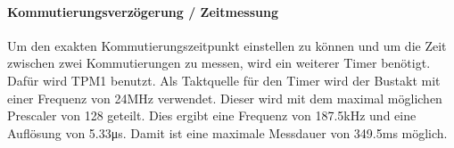 \paragraph{Kommutierungsverzögerung / Zeitmessung}$~~$\vspace{2mm}\\
\fi
Um den exakten Kommutierungszeitpunkt einstellen zu können und um die Zeit 
zwischen zwei Kommutierungen zu messen, wird ein weiterer Timer benötigt. Dafür 
wird TPM1 benutzt. Als Taktquelle für den Timer wird der Bustakt mit einer 
Frequenz von 24\si{\mega\hertz} verwendet. Dieser wird mit dem maximal möglichen 
Prescaler von 128 geteilt. Dies ergibt eine Frequenz von 187.5\si{\kilo\hertz} 
und eine Auflösung von 5.33\si{\micro\second}. Damit ist eine maximale 
Messdauer von 349.5\si{\milli\second} möglich. 
